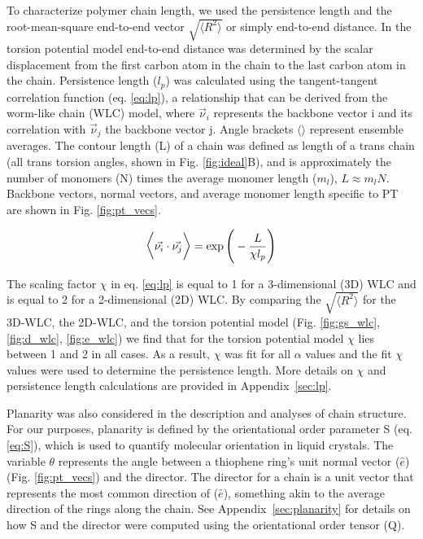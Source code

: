 To characterize polymer chain length, we used the persistence length and the root-mean-square end-to-end vector $\sqrt{\big \langle R^2 \big \rangle}$ or simply end-to-end distance. In the torsion potential model end-to-end distance was determined by the scalar displacement from the first carbon atom in the chain to the last carbon atom in the chain. Persistence length ($l_p$) was calculated using the tangent-tangent correlation function (eq. \ref{eq:lp}), a relationship that can be derived from the worm-like chain (WLC) model, where $\vec{\nu}_i$ represents the backbone vector i and its correlation with $\vec{\nu}_j$ the backbone vector j. Angle brackets $\big \langle \big \rangle$ represent ensemble averages. The contour length (L) of a chain was defined as length of a trans chain (all trans torsion angles, shown in Fig. \ref{fig:ideal}B), and is approximately the number of monomers (N) times the average monomer length ($m_l$), $L \approx m_lN$. Backbone vectors, normal vectors, and average monomer length specific to PT are shown in Fig. \ref{fig:pt_vecs}.

\begin{equation}
\Large
\Big \langle \large \Vec{\nu_i} \cdot \Vec{\nu_j} \Big \rangle = \exp{\bigg(-\frac{L}{\chi l_p}\bigg)}
\label{eq:lp}
\end{equation}

The scaling factor $\chi$ in eq. \ref{eq:lp} is equal to 1 for a 3-dimensional (3D) WLC and is equal to 2 for a 2-dimensional (2D) WLC.\cite{Meyer2016} By comparing the $\sqrt{\big \langle R^2 \big \rangle}$ for the 3D-WLC, the 2D-WLC, and the torsion potential model (Fig. \ref{fig:gs_wlc}, \ref{fig:d_wlc}, \ref{fig:e_wlc}) we find that for the torsion potential model $\chi$ lies between 1 and 2 in all cases. As a result, $\chi$ was fit for all $\alpha$ values and the fit $\chi$ values were used to determine the persistence length. More details on $\chi$ and persistence length calculations are provided in Appendix~\ref{sec:lp}.

Planarity was also considered in the description and analyses of chain structure. For our purposes, planarity is defined by the orientational order parameter S (eq. \ref{eq:S}),\cite{Allen2017} which is used to quantify molecular orientation in liquid crystals. The variable $\theta$ represents the angle between a thiophene ring's unit normal vector ($\hat{e}$) (Fig. \ref{fig:pt_vecs}) and the director. The director for a chain is a unit vector that represents the most common direction of ($\hat{e}$), something akin to the average direction of the rings along the chain. See Appendix~\ref{sec:planarity} for details on how S and the director were computed using the orientational order tensor (Q).

